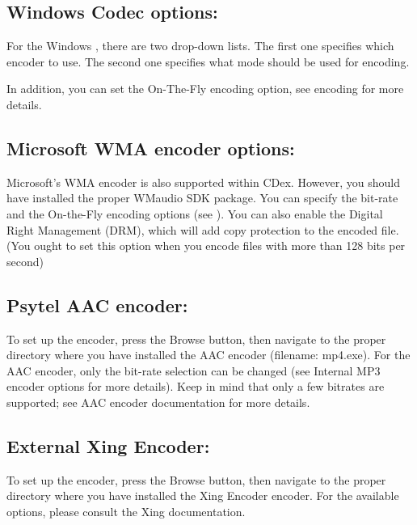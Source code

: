 \subsection{Windows Codec options:}

For the Windows , there are two drop-down lists. The first one specifies
which encoder to use. The second one specifies what mode should be used for
encoding.

In addition, you can set the On-The-Fly encoding option,
see  encoding
for more details.


\subsection{Microsoft WMA encoder options:}

Microsoft's WMA encoder is also supported within CDex. However, you should have
installed the proper WMaudio SDK package. You can specify the bit-rate and the
On-the-Fly encoding options (see
).
You can also enable the Digital Right Management (DRM), which will
add copy protection to the encoded file. (You ought to set this option when you
encode files with more than 128 bits per second)


\subsection{Psytel AAC encoder:}

To set up the encoder, press the Browse button, then navigate to the
proper directory where you have installed the AAC encoder (filename:
mp4.exe). For the AAC encoder, only the bit-rate selection can be changed (see
Internal MP3 encoder options for more details). Keep in mind that only a
few bitrates are supported; see AAC encoder documentation for more details.


\subsection{External Xing Encoder:}

To set up the encoder, press the Browse button, then navigate to the proper directory where you
have installed the Xing Encoder encoder. For the available options, please consult the Xing documentation.


